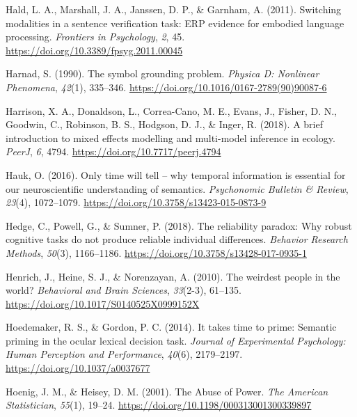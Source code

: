 \documentclass[
  12pt,
  man,floatsintext]{apa7}
\newlength{\cslhangindent}
\newlength{\cslentryspacingunit} %
\newenvironment{CSLReferences}[2] %
 {%
  \setlength{\parindent}{0pt}
  \ifodd #1
  \let\oldpar\par
  \def\par{\hangindent=\cslhangindent\oldpar}
  \fi
  \setlength{\parskip}{#2\cslentryspacingunit}
 }%
 {}
\begin{document}
\begin{CSLReferences}{1}{0}
\leavevmode{}%
Hald, L. A., Marshall, J. A., Janssen, D. P., \& Garnham, A. (2011). Switching modalities in a sentence verification task: {ERP} evidence for embodied language processing. \emph{Frontiers in Psychology}, \emph{2}, 45. \url{https://doi.org/10.3389/fpsyg.2011.00045}

\leavevmode{}%
Harnad, S. (1990). The symbol grounding problem. \emph{Physica D: Nonlinear Phenomena}, \emph{42}(1), 335--346. \url{https://doi.org/10.1016/0167-2789(90)90087-6}

\leavevmode{}%
Harrison, X. A., Donaldson, L., Correa-Cano, M. E., Evans, J., Fisher, D. N., Goodwin, C., Robinson, B. S., Hodgson, D. J., \& Inger, R. (2018). A brief introduction to mixed effects modelling and multi-model inference in ecology. \emph{PeerJ}, \emph{6}, 4794. \url{https://doi.org/10.7717/peerj.4794}

\leavevmode{}%
Hauk, O. (2016). Only time will tell -- why temporal information is essential for our neuroscientific understanding of semantics. \emph{Psychonomic Bulletin \& Review}, \emph{23}(4), 1072--1079. \url{https://doi.org/10.3758/s13423-015-0873-9}

\leavevmode{}%
Hedge, C., Powell, G., \& Sumner, P. (2018). The reliability paradox: {Why} robust cognitive tasks do not produce reliable individual differences. \emph{Behavior Research Methods}, \emph{50}(3), 1166--1186. \url{https://doi.org/10.3758/s13428-017-0935-1}

\leavevmode{}%
Henrich, J., Heine, S. J., \& Norenzayan, A. (2010). The weirdest people in the world? \emph{Behavioral and Brain Sciences}, \emph{33}(2-3), 61--135. \url{https://doi.org/10.1017/S0140525X0999152X}

\leavevmode{}%
Hoedemaker, R. S., \& Gordon, P. C. (2014). It takes time to prime: {Semantic} priming in the ocular lexical decision task. \emph{Journal of Experimental Psychology: Human Perception and Performance}, \emph{40}(6), 2179--2197. \url{https://doi.org/10.1037/a0037677}

\leavevmode{}%
Hoenig, J. M., \& Heisey, D. M. (2001). The {Abuse} of {Power}. \emph{The American Statistician}, \emph{55}(1), 19--24. \url{https://doi.org/10.1198/000313001300339897}


\end{CSLReferences}
\end{document}
